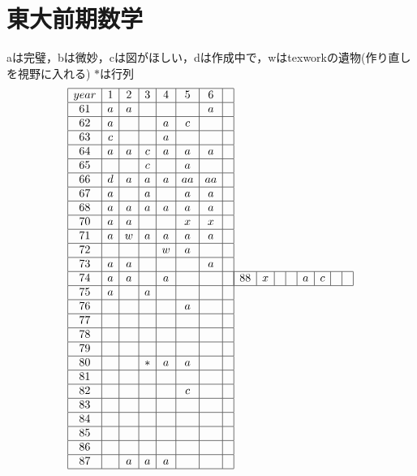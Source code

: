 \documentclass[a4j]{jarticle}
\title{}
\begin{document}

\section{東大前期数学}
aは完璧，bは微妙，cは図がほしい，dは作成中で，wはtexworkの遺物(作り直しを視野に入れる)
$*$は行列
     \begin{align*}
          \begin{array}{|c|c|c|c|c|c|c|c|} \hline
          year&1&2&3&4&5&6& \\ \hline
          61&a&a&&&&a& \\ \hline
          62&a&&&a&c&& \\ \hline
          63&c&&&a&&& \\ \hline
          64&a&a&c&a&a&a& \\ \hline
          65&&&c&&a&& \\ \hline
          66&d&a&a&a&aa&aa& \\ \hline
          67&a&&a&&a&a& \\ \hline
          68&a&a&a&a&a&a& \\ \hline
          70&a&a&&&x&x& \\ \hline
          71&a&w&a&a&a&a& \\ \hline
          72&&&&w&a&& \\ \hline
          73&a&a&&&&a& \\ \hline
          74&a&a&&a&&& \\ \hline
          75&a&&a&&&& \\ \hline
          76&&&&&a&& \\ \hline
          77&&&&&&& \\ \hline
          78&&&&&&& \\ \hline
          79&&&&&&& \\ \hline
          80&&&*&a&a&& \\ \hline
          81&&&&&&& \\ \hline
          82&&&&&c&& \\ \hline
          83&&&&&&& \\ \hline
          84&&&&&&& \\ \hline
          85&&&&&&& \\ \hline
          86&&&&&&& \\ \hline
          87&&a&a&a&&& \\ \hline
          \end{array}
          \begin{array}{|c|c|c|c|c|c|c|c|} \hline
          88&x&&&a&c&& \\ \hline

\end{array}
\end{align*}
\end{document}
